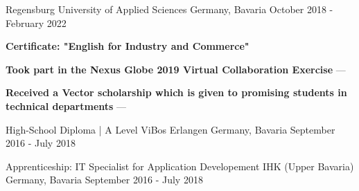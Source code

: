 

\begin{cventries}
  \cventry
    {} %
    {Regensburg University of Applied Sciences} %
    {Germany, Bavaria} %
    {October 2018 - February 2022} %
    {
      \begin{cvitems} %
        \item {\textbf{Certificate: "English for Industry and Commerce"}}
        \vspace{0.5mm}
        \item {\textbf{Took part in the Nexus Globe 2019 Virtual Collaboration Exercise} --- }
        \vspace{0.5mm}
        \item {\textbf{Received a Vector scholarship which is given to promising students in technical departments} --- }
      \end{cvitems}
    }

  \cventry
    {High-School Diploma | A Level} %
    {ViBos Erlangen} %
    {Germany, Bavaria} %
    {September 2016 - July 2018} %
    {}

  \cventry
    {Apprenticeship: IT Specialist for Application Developement} %
    {IHK (Upper Bavaria)} %
    {Germany, Bavaria} %
    {September 2016 - July 2018} %
    {}
\end{cventries}